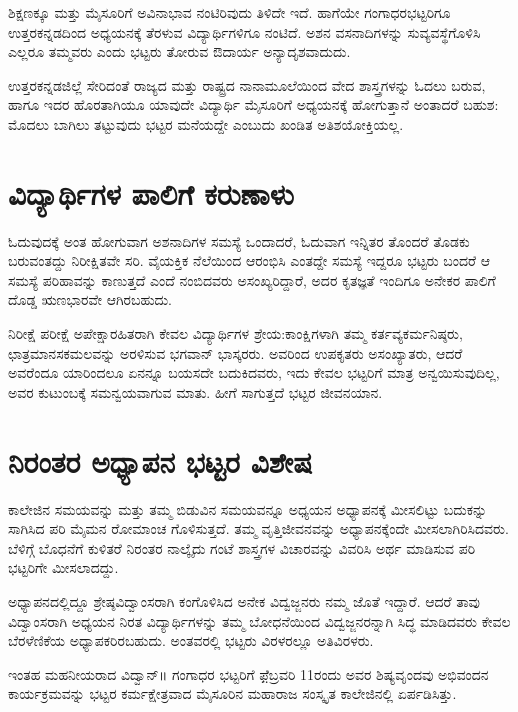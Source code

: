 {ಶಿಕ್ಷಣಕ್ಕೂ ಮತ್ತು ಮೈಸೂರಿಗೆ ಅವಿನಾಭಾವ ನಂಟಿರಿವುದು ತಿಳಿದೇ ಇದೆ. ಹಾಗೆಯೇ  ಗಂಗಾಧರಭಟ್ಟರಿಗೂ ಉತ್ತರಕನ್ನಡದಿಂದ ಅಧ್ಯಯನಕ್ಕೆ ತೆರಳುವ ವಿದ್ಯಾರ್ಥಿಗಳಿಗೂ ನಂಟಿದೆ. ಅಶನ  \enginline{-}  ವಸನಾದಿಗಳನ್ನು ಸುವ್ಯವಸ್ಥೆಗೊಳಿಸಿ ಎಲ್ಲರೂ ತಮ್ಮವರು ಎಂದು ಭಟ್ಟರು ತೋರುವ ಔದಾರ್ಯ ಅನ್ಯಾದೃಶವಾದುದು.

ಉತ್ತರಕನ್ನಡಜಿಲ್ಲೆ ಸೇರಿದಂತೆ ರಾಜ್ಯದ ಮತ್ತು ರಾಷ್ಟ್ರದ ನಾನಾಮೂಲೆಯಿಂದ ವೇದ  \enginline{-}  ಶಾಸ್ತ್ರಗಳನ್ನು ಓದಲು ಬರುವ, ಹಾಗೂ ಇದರ ಹೊರತಾಗಿಯೂ ಯಾವುದೇ ವಿದ್ಯಾರ್ಥಿ ಮೈಸೂರಿಗೆ ಅಧ್ಯಯನಕ್ಕೆ ಹೋಗುತ್ತಾನೆ ಅಂತಾದರೆ ಬಹುಶ: ಮೊದಲು ಬಾಗಿಲು ತಟ್ಟುವುದು  ಭಟ್ಟರ ಮನೆಯದ್ದೇ ಎಂಬುದು ಖಂಡಿತ ಅತಿಶಯೋಕ್ತಿಯಲ್ಲ. 

\section*{ವಿದ್ಯಾರ್ಥಿಗಳ ಪಾಲಿಗೆ ಕರುಣಾಳು}

ಓದುವುದಕ್ಕೆ ಅಂತ ಹೋಗುವಾಗ ಅಶನಾದಿಗಳ ಸಮಸ್ಯೆ ಒಂದಾದರೆ, ಓದುವಾಗ ಇನ್ನಿತರ ತೊಂದರೆ ತೊಡಕು ಬರುವಂತದ್ದು ನಿರೀಕ್ಷಿತವೇ ಸರಿ. ವೈಯಕ್ತಿಕ ನೆಲೆಯಿಂದ ಆರಂಭಿಸಿ ಎಂತದ್ದೇ ಸಮಸ್ಯೆ ಇದ್ದರೂ ಭಟ್ಟರು ಬಂದರೆ ಆ ಸಮಸ್ಯೆ ಪರಿಹಾವನ್ನು ಕಾಣುತ್ತದೆ ಎಂದೆ ನಂಬಿದವರು ಅಸಂಖ್ಯರಿದ್ದಾರೆ, ಅದರ ಕೃತಜ್ಞತೆ ಇಂದಿಗೂ ಅನೇಕರ ಪಾಲಿಗೆ ದೊಡ್ಡ ಋಣಭಾರವೇ ಆಗಿರಬಹುದು. 

ನಿರೀಕ್ಷೆ  \enginline{-}  ಪರೀಕ್ಷೆ  \enginline{-}  ಅಪೇಕ್ಷಾರಹಿತರಾಗಿ ಕೇವಲ ವಿದ್ಯಾರ್ಥಿಗಳ ಶ್ರೇಯ:ಕಾಂಕ್ಷಿಗಳಾಗಿ ತಮ್ಮ ಕರ್ತವ್ಯಕರ್ಮನಿಷ್ಠರು, ಛಾತ್ರಮಾನಸಕಮಲವನ್ನು ಅರಳಿಸುವ ಭಗವಾನ್ ಭಾಸ್ಕರರು. ಅವರಿಂದ ಉಪಕೃತರು ಅಸಂಖ್ಯಾತರು, ಆದರೆ ಅವರೆಂದೂ ಯಾರಿಂದಲೂ ಏನನ್ನೂ ಬಯಸದೇ ಬದುಕಿದವರು, ಇದು ಕೇವಲ ಭಟ್ಟರಿಗೆ ಮಾತ್ರ ಅನ್ವಯಿಸುವುದಿಲ್ಲ, ಅವರ ಕುಟುಂಬಕ್ಕೆ ಸಮನ್ವಯವಾಗುವ ಮಾತು. ಹೀಗೆ ಸಾಗುತ್ತದೆ  ಭಟ್ಟರ ಜೀವನಯಾನ.

\section*{ನಿರಂತರ ಅಧ್ಯಾಪನ   \enginline{-}   ಭಟ್ಟರ ವಿಶೇಷ}

ಕಾಲೇಜಿನ ಸಮಯವನ್ನು ಮತ್ತು ತಮ್ಮ ಬಿಡುವಿನ ಸಮಯವನ್ನೂ ಅಧ್ಯಯನ  \enginline{-}  ಅಧ್ಯಾಪನಕ್ಕೆ ಮೀಸಲಿಟ್ಟು ಬದುಕನ್ನು ಸಾಗಿಸಿದ ಪರಿ ಮೈಮನ ರೋಮಾಂಚ ಗೊಳಿಸುತ್ತದೆ. ತಮ್ಮ ವೃತ್ತಿಜೀವನವನ್ನು ಅಧ್ಯಾಪನಕ್ಕೆಂದೇ ಮೀಸಲಾಗಿರಿಸಿದವರು. ಬೆಳಿಗ್ಗೆ ಬೊಧನೆಗೆ ಕುಳಿತರೆ ನಿರಂತರ ನಾಲ್ಕೈದು ಗಂಟೆ ಶಾಸ್ತ್ರಗಳ ವಿಚಾರವನ್ನು ವಿವರಿಸಿ ಅರ್ಥ ಮಾಡಿಸುವ ಪರಿ ಭಟ್ಟರಿಗೇ ಮೀಸಲಾದದ್ದು.

ಅಧ್ಯಾಪನದಲ್ಲಿದ್ದೂ ಶ್ರೇಷ್ಠವಿದ್ವಾಂಸರಾಗಿ  ಕಂಗೊಳಿಸಿದ ಅನೇಕ ವಿದ್ವಜ್ಜನರು ನಮ್ಮ ಜೊತೆ ಇದ್ದಾರೆ. ಆದರೆ ತಾವು ವಿದ್ವಾಂಸರಾಗಿ ಅಧ್ಯಯನ ನಿರತ ವಿದ್ಯಾರ್ಥಿಗಳನ್ನು ತಮ್ಮ ಬೋಧನೆಯಿಂದ ವಿದ್ವಜ್ಜನರನ್ನಾಗಿ ಸಿದ್ಧ ಮಾಡಿದವರು ಕೇವಲ ಬೆರಳೆಣಿಕೆಯ ಅಧ್ಯಾಪಕರಿರಬಹುದು. ಅಂತವರಲ್ಲಿ ಭಟ್ಟರು ವಿರಳರಲ್ಲೂ ಅತಿವಿರಳರು.

ಇಂತಹ ಮಹನೀಯರಾದ ವಿದ್ವಾನ್॥ ಗಂಗಾಧರ ಭಟ್ಟರಿಗೆ ಫ಼ೆಬ್ರವರಿ 11ರಂದು ಅವರ ಶಿಷ್ಯವೃಂದವು  ಅಭಿವಂದನ ಕಾರ್ಯಕ್ರಮವನ್ನು ಭಟ್ಟರ ಕರ್ಮಕ್ಷೇತ್ರವಾದ ಮೈಸೂರಿನ ಮಹಾರಾಜ ಸಂಸ್ಕೃತ ಕಾಲೇಜಿನಲ್ಲಿ ಏರ್ಪಡಿಸಿತ್ತು. 

}
